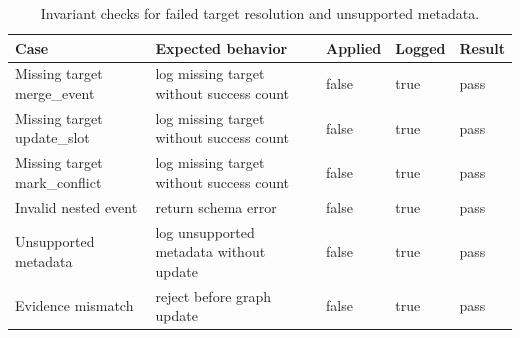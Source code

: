 \begin{table}[t]
\caption{Invariant checks for failed target resolution and unsupported metadata.}
\label{tab:invariant-checks}
\begin{tabular}{@{}p{0.21\hsize}p{0.34\hsize}lll@{}}
\toprule
Case & Expected behavior & Applied & Logged & Result\\
\midrule
Missing target merge\_event & log missing target without success count & false & true & pass\\
Missing target update\_slot & log missing target without success count & false & true & pass\\
Missing target mark\_conflict & log missing target without success count & false & true & pass\\
Invalid nested event & return schema error & false & true & pass\\
Unsupported metadata & log unsupported metadata without update & false & true & pass\\
Evidence mismatch & reject before graph update & false & true & pass\\
\bottomrule
\end{tabular}
\end{table}
